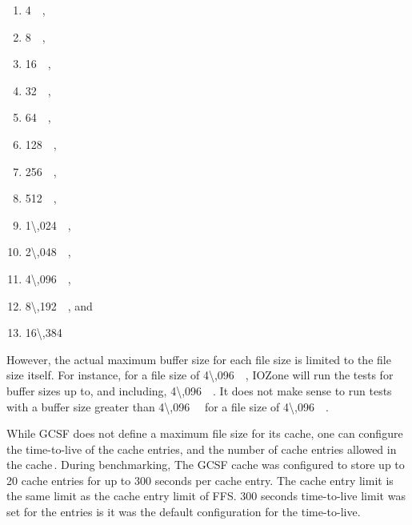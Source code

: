 \begin{enumerate}
	\item \SI{4}{\kilo\byte},
	\item \SI{8}{\kilo\byte},
	\item \SI{16}{\kilo\byte},
	\item \SI{32}{\kilo\byte},
	\item \SI{64}{\kilo\byte},
	\item \SI{128}{\kilo\byte},
	\item \SI{256}{\kilo\byte},
	\item \SI{512}{\kilo\byte},
	\item \SI{1\,024}{\kilo\byte},
	\item \SI{2\,048}{\kilo\byte},
	\item \SI{4\,096}{\kilo\byte},
	\item \SI{8\,192}{\kilo\byte}, and
	\item \SI{16\,384}{\kilo\byte}
\end{enumerate}
However, the actual maximum buffer size for each file size is limited to the file size itself. For instance, for a file size of \SI{4\,096}{\kilo\byte}, IOZone will run the tests for buffer sizes up to, and including, \SI{4\,096}{\kilo\byte}. It does not make sense to run tests with a buffer size greater than \SI{4\,096}{\kilo\byte} for a file size of \SI{4\,096}{\kilo\byte}.

While \gls{GCSF} does not define a maximum file size for its cache, one can configure the \mbox{time-to-live} of the cache entries, and the number of cache entries allowed in the cache\,\cite{sergiudanGcsfConfigRust}. During benchmarking, The \gls{GCSF} cache was configured to store up to 20 cache entries for up to 300 seconds per cache entry. The cache entry limit is the same limit as the cache entry limit of \gls{FFS}. 300 seconds \mbox{time-to-live} limit was set for the entries is it was the default configuration for the \mbox{time-to-live}.

